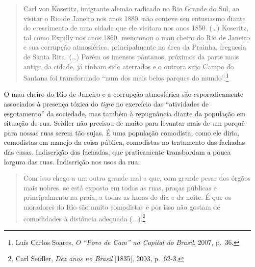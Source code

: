 \begin{quote}
Carl von Koseritz, imigrante alemão radicado no Rio Grande do Sul, ao
visitar o Rio de Janeiro nos anos 1880, não conteve seu entusiasmo
diante do crescimento de uma cidade que ele visitara nos anos 1850.
(\ldots{}) Koseritz, tal como Expilly nos anos 1860, mencionou o mau
cheiro do Rio de Janeiro e sua corrupção atmosférica, principalmente na
área da Prainha, freguesia de Santa Rita. (\ldots{}) Porém os imensos
pântanos, próximos da parte mais antiga da cidade, já tinham sido
aterrados e o outrora sujo Campo do Santana foi transformado ``num dos
mais belos parques do mundo''.\footnote{Luís Carlos Soares, \emph{O
  ``Povo de Cam'' na Capital do Brasil}, 2007, p.~36.}
\end{quote}

O mau cheiro do Rio de Janeiro e a corrupção atmosférica são
esporadicamente associados à presença tóxica do \emph{tigre} no
exercício das ``atividades de esgotamento'' da sociedade, mas também à
repugnância diante da população em situação de rua. Seidler não precisou
de muito para levantar mais de um porquê para nossas ruas serem tão
sujas. É uma população comodista, como ele diria, comodistas em manejo
da coisa pública, comodistas no tratamento das fachadas das casas.
Indiscrição das fachadas, que praticamente transbordam a pouca largura
das ruas. Indiscrição nos usos da rua.

\begin{quote}
Com isso chego a um outro grande mal a que, com grande pesar dos órgãos
mais nobres, se está exposto em todas as ruas, praças públicas e
principalmente na praia, a todas as horas do dia e da noite. É que os
moradores do Rio são muito comodistas e por isso não gostam de
comodidades à distância adequada (...).\footnote{Carl Seidler, \emph{Dez
  anos no Brasil} {[}1835{]}, 2003, p.~62-3.}
\end{quote}

